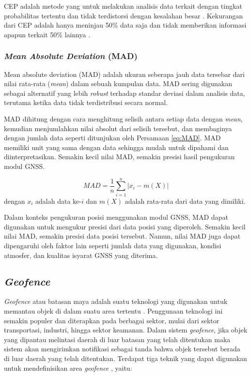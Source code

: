 CEP adalah metode yang untuk melakukan analisis data terkait dengan tingkat probabilitas tertentu dan tidak terdistorsi dengan kesalahan besar \cite{Chin1983}. Kekurangan dari CEP adalah hanya meninjau 50\% data saja dan tidak memberikan informasi apapun terkait 50\% lainnya \cite{Sathish2016}.

\subsubsection{\textit{Mean Absolute Deviation} (MAD)}
Mean absolute deviation (MAD) adalah ukuran seberapa jauh data tersebar dari nilai rata-rata (\textit{mean}) dalam sebuah kumpulan data. MAD sering digunakan sebagai alternatif yang lebih \textit{robust} terhadap standar deviasi dalam analisis data, terutama ketika data tidak terdistribusi secara normal.

MAD dihitung dengan cara menghitung selisih antara setiap data dengan \textit{mean}, kemudian menjumlahkan nilai absolut dari selisih tersebut, dan membaginya dengan jumlah data seperti ditunjukan oleh Persamaan \ref{eq:MAD}. MAD memiliki unit yang sama dengan data sehingga mudah untuk dipahami dan diinterpretasikan. Semakin kecil nilai MAD, semakin presisi hasil pengukuran modul GNSS.

\begin{equation}
	MAD = \frac{1}{n} \sum_{i=1}^{n} \left| x_i - m(X) \right|
	\label{eq:MAD}
\end{equation}
dengan $x_i$ adalah data ke-$i$ dan $m(X)$ adalah rata-rata dari data yang dimiliki.

Dalam konteks pengukuran posisi menggunakan modul GNSS, MAD dapat digunakan untuk mengukur presisi dari data posisi yang diperoleh. Semakin kecil nilai MAD, semakin presisi data posisi tersebut. Namun, nilai MAD juga dapat dipengaruhi oleh faktor lain seperti jumlah data yang digunakan, kondisi atmosfer, dan kualitas isyarat GNSS yang diterima.

\subsection{\textit{Geofence}}
\textit{Geofence} atau batasan maya adalah suatu teknologi yang digunakan untuk memantau objek di dalam suatu area tertentu \cite{Sari2021}. Penggunaan teknologi ini semakin populer dan diterapkan pada berbagai sektor, mulai dari sektor transportasi, industri, hingga sektor keamanan. Dalam sistem \textit{geofence}, jika objek yang dipantau melintasi daerah di luar batasan yang telah ditentukan maka sistem akan mengirimkan notifikasi sebagai tanda bahwa objek tersebut berada di luar daerah yang telah ditentukan. Terdapat tiga teknik yang dapat digunakan untuk mendefinisikan area \textit{geofence} \cite{Rui2015}, yaitu:


